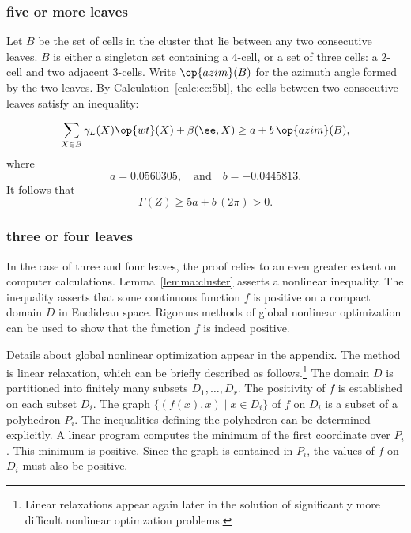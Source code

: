 {\subsubsection{five or more leaves}

Let $B$ be the set of cells in the cluster that lie between any two
consecutive leaves.  $B$ is either a singleton set containing a
$4$-cell, or a set of three cells: a $2$-cell and two adjacent
$3$-cells.  Write $\op{azim}(B)$ for the azimuth angle formed by the
two leaves.  By Calculation~\ref{calc:cc:5bl}, the cells between two
consecutive leaves satisfy an
inequality: %

\begin{displaymath} 
\sum_{X\in B} \gamma_L(X)\op{wt}(X) + \beta(\ee,X) \ge a + b\,\op{azim}(B),
\end{displaymath}
where
\begin{displaymath} 
a= 0.0560305, \quad\text{and}\quad  b= -0.0445813.
\end{displaymath}
It follows that
\begin{displaymath} 
\Gamma(Z) \ge 5 a + b\, (2\pi) > 0.
\end{displaymath}

\subsubsection{three or four leaves}\label{sec:3or4}

In the case of three and four leaves, the proof relies to an even
greater extent on computer calculations.  
Lemma~\ref{lemma:cluster} asserts a nonlinear inequality.  The inequality
asserts that some continuous function $f$ is positive on a compact
domain $D$ in Euclidean space.  Rigorous methods of global nonlinear
optimization can be used to show that the function $f$ is indeed
positive.

Details about global nonlinear optimization appear in the appendix.
The method is linear relaxation, which can be briefly described as
follows.\footnote{Linear relaxations appear again later in the
solution of significantly more difficult nonlinear optimzation
problems.}  The domain $D$ is partitioned into finitely many subsets
$D_1,\ldots, D_r$.  The positivity of $f$ is established on each
subset $D_i$.  The graph $\{(f(x), x)\mid x\in D_i\}$ of $f$ on $D_i$
is a subset of a polyhedron $P_i$.  The inequalities defining the
polyhedron can be determined explicitly.  A linear program computes
the minimum of the first coordinate over $P_i$.  This minimum is
positive.  Since the graph is contained in $P_i$, the values of $f$ on
$D_i$ must also be positive.

}
